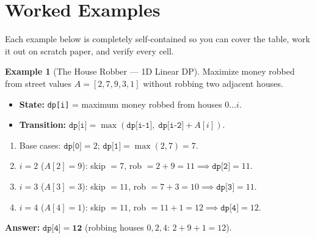 \documentclass[11pt,a4paper]{article}
\theoremstyle{definition}
\newtheorem{example}{Example}[section]
\begin{document}
\section{Worked Examples}

Each example below is completely self-contained so you can cover the table, work it out on scratch paper, and verify every cell.

\begin{example}[The House Robber --- 1D Linear DP]
Maximize money robbed from street values $A = [2, 7, 9, 3, 1]$ without robbing two adjacent houses.
\begin{itemize}
    \item \textbf{State:} \texttt{dp[i]} = maximum money robbed from houses $0 \dots i$.
    \item \textbf{Transition:} $\texttt{dp[i]} = \max(\texttt{dp[i-1]},\; \texttt{dp[i-2]} + A[i])$.
\end{itemize}
\begin{enumerate}
    \item Base cases: $\texttt{dp[0]} = 2$; $\texttt{dp[1]} = \max(2, 7) = 7$.
    \item $i = 2$ ($A[2] = 9$): skip $= 7$, rob $= 2 + 9 = 11 \implies \texttt{dp[2]} = 11$.
    \item $i = 3$ ($A[3] = 3$): skip $= 11$, rob $= 7 + 3 = 10 \implies \texttt{dp[3]} = 11$.
    \item $i = 4$ ($A[4] = 1$): skip $= 11$, rob $= 11 + 1 = 12 \implies \texttt{dp[4]} = 12$.
\end{enumerate}
\textbf{Answer:} $\texttt{dp[4]} = \mathbf{12}$ (robbing houses $0, 2, 4$: $2 + 9 + 1 = 12$).
\end{example}
\end{document}
